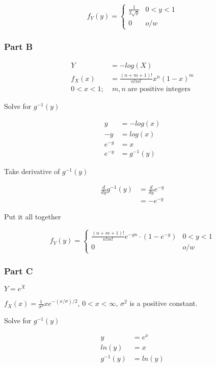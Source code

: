 \[
	f_Y(y) = \begin{cases}
		\frac{1}{2\sqrt{y}} & 0 < y < 1 \\
		0 & o/w
	\end{cases}
\]


\subsubsection*{Part B}

\begin{align*}
	Y &= -log(X) \\
	f_X(x) &= \frac{(n+m+1)!}{n!m!}x^n(1-x)^m \\
	0<x<1 ;& \; m,n \; \text{are positive integers}
\end{align*}

\noindent Solve for $g^{-1}(y)$

\begin{align*}
	y &= -log(x) \\
	-y &= log(x) \\
	e^{-y} &= x \\
	e^{-y} &= g^{-1}(y)
\end{align*}

\noindent Take derivative of $g^{-1}(y)$

\begin{align*}
	\frac{d}{dy} g^{-1}(y) &= \frac{d}{dy} e^{-y} \\
	&= -e^{-y}
\end{align*}

\noindent Put it all together

\[
	f_Y(y) = \begin{cases}
		\frac{(n+m+1)!}{n!m!} e^{-yn} \cdot (1 - e^{-y}) & 0 < y < 1 \\
		0 & o/w
	\end{cases}
\]

\pagebreak

\subsubsection*{Part C}

$Y = e^X$

\noindent $f_X(x) = \frac{1}{\sigma^2} x e^{-(x/\sigma)/2}$, $0 < x < \infty$, $\sigma^2$ is a positive constant.

\noindent Solve for $g^{-1}(y)$

\begin{align*}
	y &= e^x \\
	ln(y) &= x \\
	g^{-1}(y) &= ln(y)
\end{align*}

